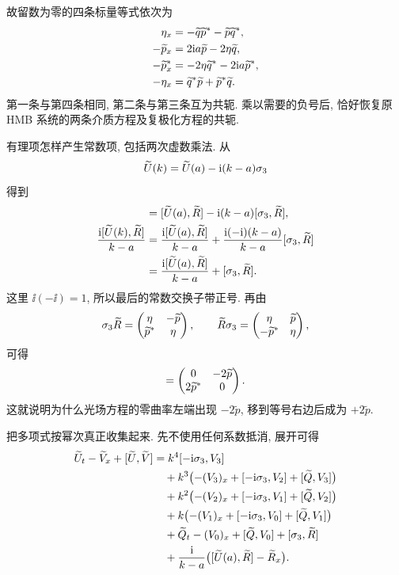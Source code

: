故留数为零的四条标量等式依次为
\begin{align*}
\eta_x&=-\widetilde q{\widetilde p}^{*}
-\widetilde p{\widetilde q}^{*},\\
-\widetilde p_x&=2\mathrm{i} a\widetilde p-2\eta\widetilde q,\\
-{\widetilde p_x}^{*}
&=-2\eta{\widetilde q}^{*}-2\mathrm{i} a{\widetilde p}^{*},\\
-\eta_x&={\widetilde q}^{*}\widetilde p
+{\widetilde p}^{*}\widetilde q.
\end{align*}
第一条与第四条相同, 第二条与第三条互为共轭. 乘以需要的负号后, 恰好恢复原 HMB 系统的两条介质方程及复极化方程的共轭.
\par\smallskip\noindent 有理项怎样产生常数项, 包括两次虚数乘法.\quad
从
\begin{equation*}
\widetilde U(k)=\widetilde U(a)-\mathrm{i}(k-a)\sigma_3
\end{equation*}
得到
\begin{align*}
[\widetilde U(k),\widetilde R]
&=[\widetilde U(a),\widetilde R]
-\ii(k-a)[\sg,\widetilde R],\\
\dfrac{\ii[\widetilde U(k),\widetilde R]}{k-a}
&=\dfrac{\ii[\widetilde U(a),\widetilde R]}{k-a}
+\dfrac{\ii(-\ii)(k-a)}{k-a}[\sg,\widetilde R]\\
&=\dfrac{\ii[\widetilde U(a),\widetilde R]}{k-a}
+[\sg,\widetilde R].
\end{align*}
这里 $\ii(-\ii)=1$, 所以最后的常数交换子带正号. 再由
\begin{equation*}
\sigma_3\widetilde R=
\begin{pmatrix}\eta&-\widetilde p\\{\widetilde p}^{*}&\eta\end{pmatrix},
\qquad
\widetilde R\sigma_3=
\begin{pmatrix}\eta&\widetilde p\\-{\widetilde p}^{*}&\eta\end{pmatrix},
\end{equation*}
可得
\begin{equation*}
[\sg,\widetilde R]
=\begin{pmatrix}0&-2\widetilde p\\2\conj{\widetilde p}&0\end{pmatrix}.
\end{equation*}
这就说明为什么光场方程的零曲率左端出现 $-2\widetilde p$, 移到等号右边后成为 $+2\widetilde p$.
\par\smallskip\noindent 把多项式按幂次真正收集起来.\quad
先不使用任何系数抵消, 展开可得
\begin{align*}
\widetilde U_t-\widetilde V_x
+[\widetilde U,\widetilde V]
&=k^4[-\mathrm{i}\sigma_3,V_3]\\
&\quad+k^3\bigl(-(V_3)_x
+[-\mathrm{i}\sigma_3,V_2]+[\widetilde Q,V_3]\bigr)\\
&\quad+k^2\bigl(-(V_2)_x
+[-\mathrm{i}\sigma_3,V_1]+[\widetilde Q,V_2]\bigr)\\
&\quad+k\bigl(-(V_1)_x
+[-\mathrm{i}\sigma_3,V_0]+[\widetilde Q,V_1]\bigr)\\
&\quad+\widetilde Q_t-(V_0)_x+[\widetilde Q,V_0]
+[\sigma_3,\widetilde R]\\
&\quad+\dfrac{\mathrm{i}}{k-a}
\bigl([\widetilde U(a),\widetilde R]-\widetilde R_x\bigr).
\end{align*}
